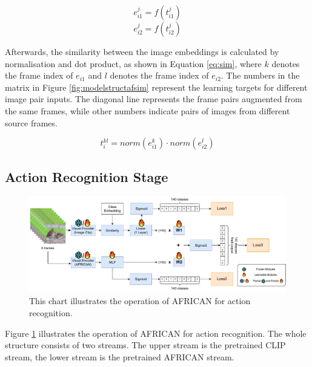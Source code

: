 \begin{equation}
    \label{eq:enc1}
    e_{i1}^j = f(t_{i1}^j)
\end{equation}
\begin{equation}
    \label{eq:enc2}
    e_{i2}^j = f(t_{i2}^j)
\end{equation}

Afterwards, the similarity between the image embeddings is calculated by normalisation and dot product, as shown in Equation \ref{eq:sim}, where $k$ denotes the frame index of $e_{i1}$ and $l$ denotes the frame index of $e_{i2}$. The numbers in the matrix in Figure \ref{fig:modelstructafsim} represent the learning targets for different image pair inputs. The diagonal line represents the frame pairs augmented from the same frames, while other numbers indicate pairs of images from different source frames. 

\begin{equation}
    \label{eq:sim}
    t_{i}^{kl} = norm(e_{i1}^{k}) \cdot norm(e_{i2}^{l})
\end{equation}




\subsection{Action Recognition Stage}

\begin{figure}[ht]
    \centering
    \includegraphics[width=1.0\textwidth]{assets/charts/3_4_ModelStructureAF}
    \caption[Operation of AFRICAN for action recognition]{This chart illustrates the operation of AFRICAN for action recognition.}
    \label{fig:modelstructaf_ar}
\end{figure}

Figure \ref{fig:modelstructaf_ar} illustrates the operation of AFRICAN for action recognition. The whole structure consists of two streams. The upper stream is the pretrained CLIP stream, the lower stream is the pretrained AFRICAN stream. 

